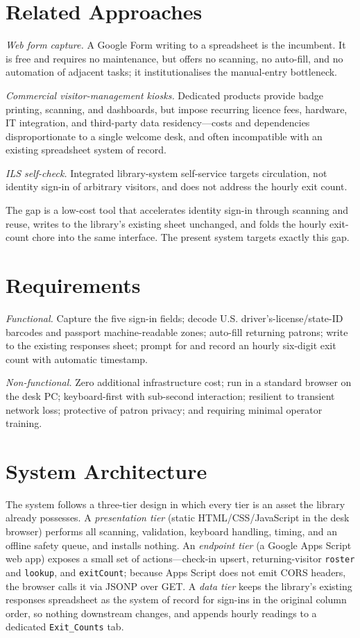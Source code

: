 \documentclass[conference]{IEEEtran}
\begin{document}
\section{Related Approaches}
\textit{Web form capture.} A Google Form writing to a spreadsheet is the incumbent. It is free and requires no maintenance, but offers no scanning, no auto-fill, and no automation of adjacent tasks; it institutionalises the manual-entry bottleneck.

\textit{Commercial visitor-management kiosks.} Dedicated products provide badge printing, scanning, and dashboards, but impose recurring licence fees, hardware, IT integration, and third-party data residency---costs and dependencies disproportionate to a single welcome desk, and often incompatible with an existing spreadsheet system of record.

\textit{ILS self-check.} Integrated library-system self-service targets circulation, not identity sign-in of arbitrary visitors, and does not address the hourly exit count.

The gap is a low-cost tool that accelerates identity sign-in through scanning and reuse, writes to the library's existing sheet unchanged, and folds the hourly exit-count chore into the same interface. The present system targets exactly this gap.

\section{Requirements}
\textit{Functional.} Capture the five sign-in fields; decode U.S. driver's-license/state-ID barcodes and passport machine-readable zones; auto-fill returning patrons; write to the existing responses sheet; prompt for and record an hourly six-digit exit count with automatic timestamp.

\textit{Non-functional.} Zero additional infrastructure cost; run in a standard browser on the desk PC; keyboard-first with sub-second interaction; resilient to transient network loss; protective of patron privacy; and requiring minimal operator training.

\section{System Architecture}
The system follows a three-tier design in which every tier is an asset the library already possesses. A \emph{presentation tier} (static HTML/CSS/JavaScript in the desk browser) performs all scanning, validation, keyboard handling, timing, and an offline safety queue, and installs nothing. An \emph{endpoint tier} (a Google Apps Script web app) exposes a small set of actions---check-in upsert, returning-visitor \texttt{roster} and \texttt{lookup}, and \texttt{exitCount}; because Apps Script does not emit CORS headers, the browser calls it via JSONP over GET. A \emph{data tier} keeps the library's existing responses spreadsheet as the system of record for sign-ins in the original column order, so nothing downstream changes, and appends hourly readings to a dedicated \texttt{Exit\_Counts} tab.
\end{document}
